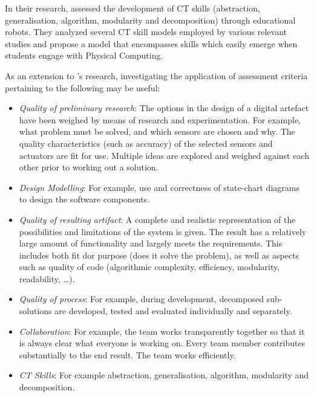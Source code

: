 In their research,  assessed the development of CT skills (abstraction, generalisation, algorithm, modularity and decomposition) through educational robots. They analyzed several CT skill models employed by various relevant studies and propose a model that encompasses skills which easily emerge when students engage with Physical Computing.

As an extension to \citeauthor{mareen2018PhysComp}'s research, investigating the application of assessment criteria pertaining to the following may be useful:
\begin{itemize}
\item \textit{Quality of preliminary research}: The options in the design of a digital artefact have been weighed by means of research and experimentation. For example, what problem must be solved, and which sensors are chosen and why. The quality characteristics (such as accuracy) of the selected sensors and actuators are fit for use. Multiple ideas are explored and weighed against each other prior to working out a solution.

\item \textit{Design Modelling}: For example, use and correctness of state-chart diagrams to design the software components.

\item \textit{Quality of resulting artifact}: A complete and realistic representation of the possibilities and limitations of the system is given. The result has a relatively large amount of functionality and largely meets the requirements. This includes both fit dor purpose (does it solve the problem), as well as aspects such as quality of code (algorithmic complexity, efficiency, modularity, readability, \ldots).

\item \textit{Quality of process}: For example, during development, decomposed sub-solutions are developed, tested and evaluated individually and separately.

\item \textit{Collaboration}: For example, the team works transparently together so that it is always clear what everyone is working on. Every team member contributes substantially to the end result. The team works efficiently.

\item \textit{CT Skills}: For example abstraction, generalisation, algorithm, modularity and decomposition.

\end{itemize}



